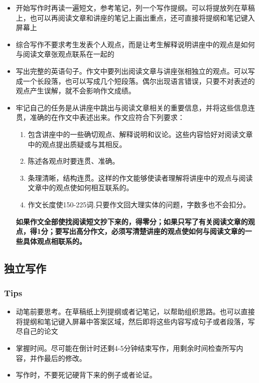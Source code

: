 \documentclass[UTF8]{ctexart}
\begin{document}
\begin{itemize}
  \item 开始写作时再读一遍短文，参考笔记，列一个写作提纲。可以将提放列在草稿上，也可以再阅读文章和讲座的笔记上画出重点，还可直接将提纲和笔记键入屏幕上
  \item 综合写作不要求考生发表个人观点，而是让考生解释说明讲座中的观点是如何与阅读文章张观点联系在一起的
  \item 写出完整的英语句子。作文中要列出阅读文章与讲座张相独立的观点。可以写成一个长段落，也可以写成几个短段落。偶尔出现语言错误，只要不对表述的观点产生误解，就不会影响作文成绩。
  \item 牢记自己的任务是从讲座中跳出与阅读文章相关的重要信息，并将这些信息连贯，准确的在作文中表述出来。作文应符合下列要求：
  \begin{enumerate}
    \item 包含讲座中的一些确切观点、解释说明和议论。这些内容恰好对阅读文章中的观点提出质疑或与其相反。
    \item 陈述各观点时要连贯、准确。
    \item 条理清晰，结构连贯。这样的作文能够使读者理解将讲座中的观点与阅读文章中的观点使如何相互联系的。
    \item 作文长度使150-225词.只要作文回大理实体的问题，字数多也不会扣分。
  \end{enumerate}
  \textbf{如果作文全部使找阅读短文抄下来的，得零分；如果只写了有关阅读文章的观点，得1分；要写出高分作文，必须写清楚讲座的观点使如何与阅读文章的一些具体观点相联系的。}
\end{itemize}
\subsection{独立写作}
\subsubsection{Tips}
\begin{itemize}
  \item 动笔前要思考。在草稿纸上列提纲或者记笔记，以帮助组织思路。也可以直接将提纲和笔记键入屏幕中答案区域，然后即将这些内容写成句子或者段落，写尽自己的论文
  \item 掌握时间。尽可能在倒计时还剩4-5分钟结束写作，用剩余时间检查所写内容，并作最后的修改。
  \item 写作时，不要死记硬背下来的例子或者论证。
\end{itemize}
\end{document}
